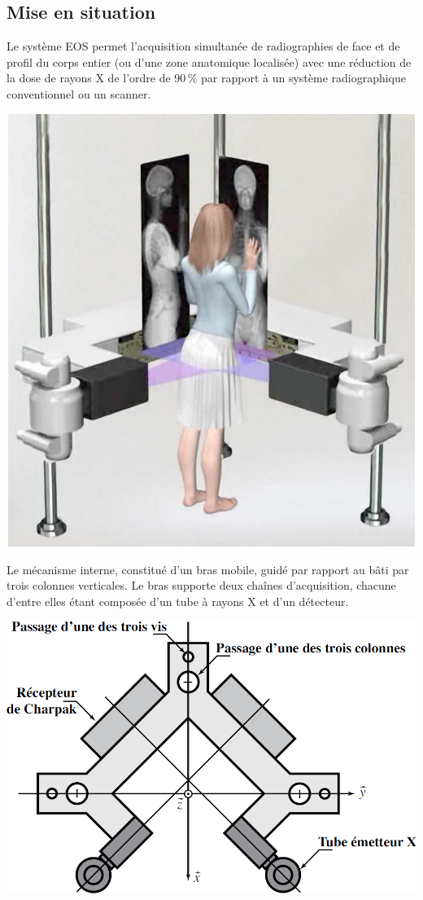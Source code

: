\documentclass[10pt,fleqn]{article} %
\begin{document}

\vspace{5cm}
\pagestyle{fancy}
\thispagestyle{plain}


\def\columnseprulecolor{\color{ocre}}
\setlength{\columnseprule}{0.4pt} 

\begin{multicols}{2}

\subsection*{Mise en situation}
Le système EOS permet l’acquisition simultanée de radiographies de face et de profil du corps entier (ou d’une zone anatomique localisée) avec une réduction de la dose de rayons X de l’ordre de 90\,\% par rapport à un système radiographique conventionnel ou un scanner.


\begin{center}
\includegraphics[width=.7\linewidth]{images/fig_02}
\end{center}

Le mécanisme interne, constitué d’un bras mobile, guidé par rapport au bâti par trois colonnes
verticales. Le bras supporte deux chaînes d’acquisition, chacune d’entre elles étant composée d’un tube à rayons X et d’un détecteur.

\begin{center}
\includegraphics[width=.7\linewidth]{images/fig_03}
\end{center}



\end{multicols}
\end{document}
